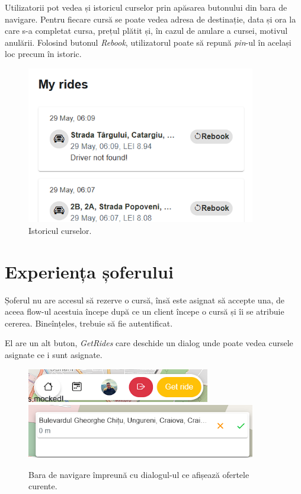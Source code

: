 Utilizatorii pot vedea și istoricul curselor prin apăsarea butonului din bara de navigare.
Pentru fiecare cursă se poate vedea adresa de destinație, data și ora la care s-a completat cursa, prețul plătit
și, în cazul de anulare a cursei, motivul anulării. Folosind butonul \textit{Rebook}, utilizatorul poate
să repună \textit{pin}-ul în același loc precum în istoric.

\begin{figure}[H]
    \centering
    \includegraphics[width=10cm]{Assets/history.png}
    \caption{Istoricul curselor.}
    \label{fig:historyRides}
\end{figure}

\section{Experiența șoferului}

Șoferul nu are accesul să rezerve o cursă, însă este asignat să accepte una, de aceea flow-ul acestuia începe după 
ce un client începe o cursă și îi se atribuie cererea. Bineînțeles, trebuie să fie autentificat.

El are un alt buton, \textit{GetRides} care deschide un dialog unde poate vedea cursele asignate ce i sunt asignate.

\begin{figure}[H]
    \centering
    \includegraphics[width=8cm]{Assets/driverNavBar.png}
    \includegraphics[width=10cm]{Assets/acceptRide.png}
    \caption{Bara de navigare împreună cu dialogul-ul ce afișează ofertele curente.}
    \label{fig:driverNavBar}
\end{figure}

